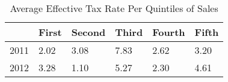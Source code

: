 \begin{table}[htbp]
\caption{\label{tab:table5} Average Effective Tax Rate Per Quintiles of Sales}\centering\medskip
\begin{tabular}{llllll} \hline \hline
 & First  & Second  & Third  & Fourth  & Fifth  \\  \hline 
2011 &      2.02 &      3.08 &      7.83 &      2.62 &      3.20 \\  
2012 &      3.28 &      1.10 &      5.27 &      2.30 &      4.61 \\  
\hline \hline \end{tabular}
\end{table}
